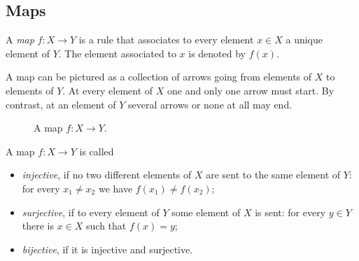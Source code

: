 \subsection{Maps}
A \emph{map} $f \colon X \to Y$ is a rule that associates to every element $x \in X$ a unique element of $Y$.
The element associated to $x$ is denoted by $f(x)$.

A map can be pictured as a collection of arrows going from elements of $X$ to elements of $Y$.
At every element of $X$ one and only one arrow must start.
By contrast, at an element of $Y$ several arrows or none at all may end.

\begin{figure}[ht]
\begin{center}

\end{center}
\caption{A map $f \colon X \to Y$.}
\label{fig:Map}
\end{figure}

A map $f \colon X \to Y$ is called
\begin{itemize}
\item
\emph{injective}, if no two different elements of $X$ are sent to the same element of $Y$: for every $x_1 \ne x_2$ we have $f(x_1) \ne f(x_2)$;
\item
\emph{surjective}, if to every element of $Y$ some element of $X$ is sent: for every $y \in Y$ there is $x \in X$ such that $f(x) = y$;
\item
\emph{bijective}, if it is injective and surjective.
\end{itemize}
